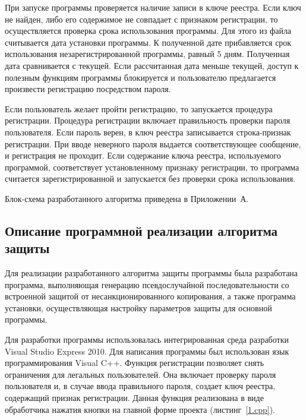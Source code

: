 При запуске программы проверяется наличие записи в ключе реестра. Если
ключ не найден, либо его содержимое не совпадает с признаком
регистрации, то осуществляется проверка срока использования
программы. Для этого из файла считывается дата установки программы. К
полученной дате прибавляется срок использования незарегистрированной
программы, равный 5 дням. Полученная дата сравнивается с текущей. Если
рассчитанная дата меньше текущей, доступ к полезным функциям программы
блокируется и пользователю предлагается произвести регистрацию
посредством пароля.

Если пользователь желает пройти регистрацию, то запускается процедура
регистрации. Процедура регистрации включает правильность проверки
пароля пользователя. Если пароль верен, в ключ реестра записывается
строка-признак регистрации. При вводе неверного пароля выдается
соответствующее сообщение, и регистрация не проходит.  Если содержание
ключа реестра, используемого программой, соответствует установленному
признаку регистрации, то программа считается зарегистрированной и
запускается без проверки срока использования.

Блок-схема разработанного алгоритма приведена в
Приложении~А.

\subsection{Описание программной реализации алгоритма защиты}
\label{sec:--3}

Для реализации разработанного алгоритма защиты программы была
разработана программа, выполняющая генерацию псевдослучайной
последовательности со встроенной защитой от несанкционированного
копирования, а также программа установки, осуществляющая настройку
параметров защиты для основной программы. 

Для разработки программы использовалась интегрированная среда
разработки Visual Studio Express 2010. Для написания программы был
использован язык программирования Visual C++.  Функция регистрации
позволяет снять ограничения для легальных пользователей. Она включает
проверку пароля пользователя и, в случае ввода правильного пароля,
создает ключ реестра, содержащий признак регистрации. Данная функция
реализована в виде обработчика нажатия кнопки на главной форме
проекта (листинг~\ref{1.cpp}).

